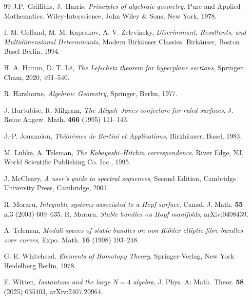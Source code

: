 \documentclass[
  a4paper, 
  reqno, 
  oneside, 
  11pt
]{amsart}
\theoremstyle{plain}	%
\theoremstyle{mydef} %
\theoremstyle{remark}
\theoremstyle{definition}
\theoremstyle{remark}
\begin{document}
\begin{thebibliography}{99}
J.P.~Griffiths, J.~Harris,
{\it Principles of algebraic geometry}. Pure and Applied Mathematics. Wiley-Interscience,
 John Wiley \& Sons, New York, 1978.

 I. M. Gelfand, M. M. Kapranov, A. V. Zelevinsky, 
{\it Discriminant, Resultants, and Multidimensional Determinants}, Modern Birk\"{a}user Classics,
Birk\"{a}user, Boston Basel Berlin, 1994.


 H. A. Hamm, D. T. L\^{e}, 
{\it The Lefschetz theorem for hyperplane sections},
Springer, Cham, 2020, 491--540.

 R. Harshorne, {\it Algebraic Geometry}, Springer, Berlin, 1977.


  J. Hurtubise, R. Milgram,  {\it The Atiyah--Jones conjecture for ruled surfaces},
 J. Reine Angew. Math. {\bf 466} (1995) 111--143.


 J.-P. Jouanolou, {\it Th\'{e}or\`{e}mes de Bertini et Applications}, Birkh\"{a}user, Basel, 1983.

 M. L\"ubke, A. Teleman,  {\it The Kobayashi–Hitchin correspondence}, River Edge, NJ,
 World Scientific Publishing Co. Inc.,  1995.



 J. McCleary, {\it A user's guide to spectral sequences}, Second Edition, Cambridge University Press, Cambridge, 2001.

 R. Moraru, {\it Integrable systems associated to a Hopf surface}, Canad. J. Math. {\bf 55} n.3
(2003) 609--635.
 R. Moraru, {\it Stable bundles on Hopf manifolds}, arXiv:0408439.


 A. Teleman, {\it Moduli spaces of stable bundles on non-K\" ahler elliptic
fibre bundles over curves}, Expo. Math. \textbf{16} (1998) 193--248.


 G. E. Whitehead, {\it Elements of Homotopy Theory}, Springer-Verlag, New York Heidelberg Berlin, 1978.  %

 E. Witten, {\it Instantons and the large $N=4$ algebra}, J. Phys. A: Math. Theor. {\bf 58} (2025) 035403, arXiv:2407.20964.


\end{thebibliography}
\end{document}
